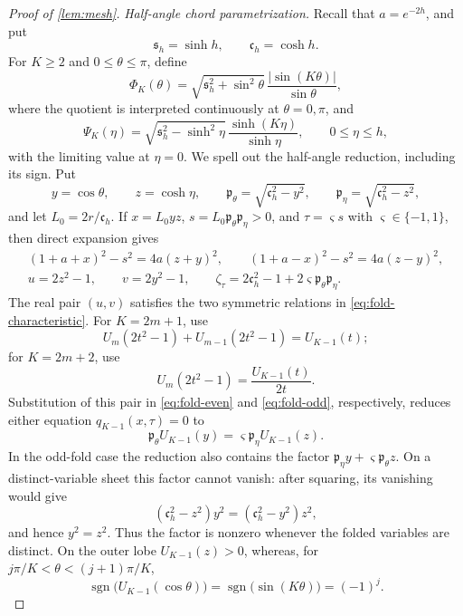 \documentclass[review,hidelinks,onefignum,onetabnum]{siamart251216}
\begin{document}
\begin{proof}[Proof of \cref{lem:mesh}]
\medskip\noindent\emph{Half-angle chord parametrization.}\quad
Recall that \(a=e^{-2h}\), and put
\[
 \mathfrak s_h=\sinh h,\qquad \mathfrak c_h=\cosh h.
\]
For \(K\geq2\) and \(0\leq\theta\leq\pi\), define
\begin{equation}\label{eq:Phi-Psi-def}
 \Phi_K(\theta)=\sqrt{\mathfrak s_h^2+\sin^2\theta}\,
 \frac{|\sin(K\theta)|}{\sin\theta},
\end{equation}
where the quotient is interpreted continuously at \(\theta=0,\pi\),
and
\[
 \Psi_K(\eta)=\sqrt{\mathfrak s_h^2-\sinh^2\eta}\,
 \frac{\sinh(K\eta)}{\sinh\eta},\qquad0\leq\eta\leq h,
\]
with the limiting value at \(\eta=0\).  We spell out the half-angle
reduction, including its sign.  Put
\[
 y=\cos\theta,\qquad z=\cosh\eta,\qquad
 \mathfrak p_\theta=\sqrt{\mathfrak c_h^2-y^2},\qquad
 \mathfrak p_\eta=\sqrt{\mathfrak c_h^2-z^2},
\]
and let \(L_0=2r/\mathfrak c_h\).  If
\(x=L_0yz\), \(s=L_0\mathfrak p_\theta\mathfrak p_\eta>0\), and
\(\tau=\varsigma s\) with \(\varsigma\in\{-1,1\}\), then direct
expansion gives
\begin{equation}\label{eq:half-variable-identities}
\begin{gathered}
 (1+a+x)^2-s^2=4a(z+y)^2,\qquad
 (1+a-x)^2-s^2=4a(z-y)^2,\\
 u=2z^2-1,\qquad v=2y^2-1,\qquad
 \zeta_\tau=2\mathfrak c_h^2-1
 +2\varsigma\mathfrak p_\theta\mathfrak p_\eta.
\end{gathered}
\end{equation}
The real pair \((u,v)\) satisfies the two symmetric relations in
\eqref{eq:fold-characteristic}.
For \(K=2m+1\), use
\[
 U_m(2t^2-1)+U_{m-1}(2t^2-1)=U_{K-1}(t);
\]
for \(K=2m+2\), use
\[
 U_m(2t^2-1)=\frac{U_{K-1}(t)}{2t}.
\]
Substitution of this pair in \eqref{eq:fold-even} and
\eqref{eq:fold-odd}, respectively, reduces either equation
\(q_{K-1}(x,\tau)=0\) to
\begin{equation}\label{eq:signed-half-chord}
 \mathfrak p_\theta U_{K-1}(y)
 =\varsigma\mathfrak p_\eta U_{K-1}(z).
\end{equation}
In the odd-fold case the reduction also contains the factor
\(\mathfrak p_\eta y+\varsigma\mathfrak p_\theta z\).  On a
distinct-variable sheet this factor cannot vanish: after squaring, its
vanishing would give
\[
 (\mathfrak c_h^2-z^2)y^2=(\mathfrak c_h^2-y^2)z^2,
\]
and hence \(y^2=z^2\).  Thus the factor is nonzero whenever the folded
variables are distinct.  On the outer lobe
\(U_{K-1}(z)>0\), whereas, for
\(j\pi/K<\theta<(j+1)\pi/K\),
\[
 \operatorname{sgn}\bigl(U_{K-1}(\cos\theta)\bigr)
 =\operatorname{sgn}\bigl(\sin(K\theta)\bigr)=(-1)^j.
\]
\end{proof}
\end{document}
